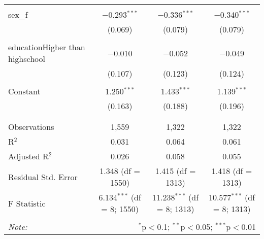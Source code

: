 \begin{table}[!htbp]
\begin{tabular}{@{\extracolsep{5pt}}lccc}
  & & & \\ 
 sex\_f & $-$0.293$^{***}$ & $-$0.336$^{***}$ & $-$0.340$^{***}$ \\ 
  & (0.069) & (0.079) & (0.079) \\ 
  & & & \\ 
 educationHigher than highschool & $-$0.010 & $-$0.052 & $-$0.049 \\ 
  & (0.107) & (0.123) & (0.124) \\ 
  & & & \\ 
 Constant & 1.250$^{***}$ & 1.433$^{***}$ & 1.139$^{***}$ \\ 
  & (0.163) & (0.188) & (0.196) \\ 
  & & & \\ 
\hline \\[-1.8ex] 
Observations & 1,559 & 1,322 & 1,322 \\ 
R$^{2}$ & 0.031 & 0.064 & 0.061 \\ 
Adjusted R$^{2}$ & 0.026 & 0.058 & 0.055 \\ 
Residual Std. Error & 1.348 (df = 1550) & 1.415 (df = 1313) & 1.418 (df = 1313) \\ 
F Statistic & 6.134$^{***}$ (df = 8; 1550) & 11.238$^{***}$ (df = 8; 1313) & 10.577$^{***}$ (df = 8; 1313) \\ 
\hline 
\hline \\[-1.8ex] 
\textit{Note:}  & \multicolumn{3}{r}{$^{*}$p$<$0.1; $^{**}$p$<$0.05; $^{***}$p$<$0.01} \\ 
\end{tabular} 
\end{table} 
